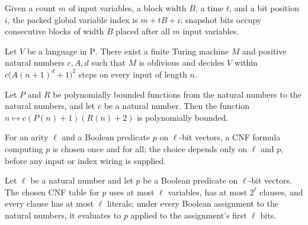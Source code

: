 \begin{definition}
\label{Complexity.clPack}
\leanok
Given a count $m$ of input variables, a block width $B$, a time $t$, and a bit position $i$, the packed global variable index is $m + tB + i$: snapshot bits occupy consecutive blocks of width $B$ placed after all $m$ input variables.
\end{definition}

\begin{lemma}
\label{Complexity.clObliviousVerifier}
\leanok
{}
Let $V$ be a language in $\mathrm{P}$. There exist a finite Turing machine $M$ and
positive natural numbers $c,A,d$ such that $M$ is oblivious and decides $V$ within
$c\bigl(A(n+1)^d+1\bigr)^2$ steps on every input of length $n$.
\end{lemma}

\begin{lemma}
\label{Complexity.clLoop_polyBound}
\leanok
{}
Let $P$ and $R$ be polynomially bounded functions from the natural numbers to the
natural numbers, and let $c$ be a natural number. Then the function $n\mapsto
c(P(n)+1)(R(n)+2)$ is polynomially bounded.
\end{lemma}

\begin{definition}
\label{Complexity.clTemplate}
\leanok
{}
For an arity $\ell$ and a Boolean predicate $p$ on $\ell$-bit vectors, a CNF formula computing $p$ is chosen once and for all; the choice depends only on $\ell$ and $p$, before any input or index wiring is supplied.
\end{definition}

\begin{lemma}
\label{Complexity.clTemplate_spec}
\leanok
{}
Let $\ell$ be a natural number and let $p$ be a Boolean predicate on $\ell$-bit vectors.
The chosen CNF table for $p$ uses at most $\ell$ variables, has at most $2^\ell$
clauses, and every clause has at most $\ell$ literals; under every Boolean assignment to
the natural numbers, it evaluates to $p$ applied to the assignment's first $\ell$ bits.
\end{lemma}

